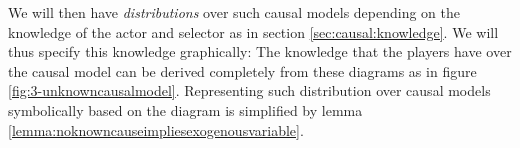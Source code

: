 We will then have \textit{distributions} over such causal models depending on the knowledge of the actor and selector as in section \ref{sec:causal:knowledge}. We will thus specify this knowledge graphically: The knowledge that the players have over the causal model can be derived completely from these diagrams as in figure \ref{fig:3-unknowncausalmodel}. Representing such distribution over causal models symbolically based on the diagram is simplified by lemma \ref{lemma:noknowncauseimpliesexogenousvariable}. 

